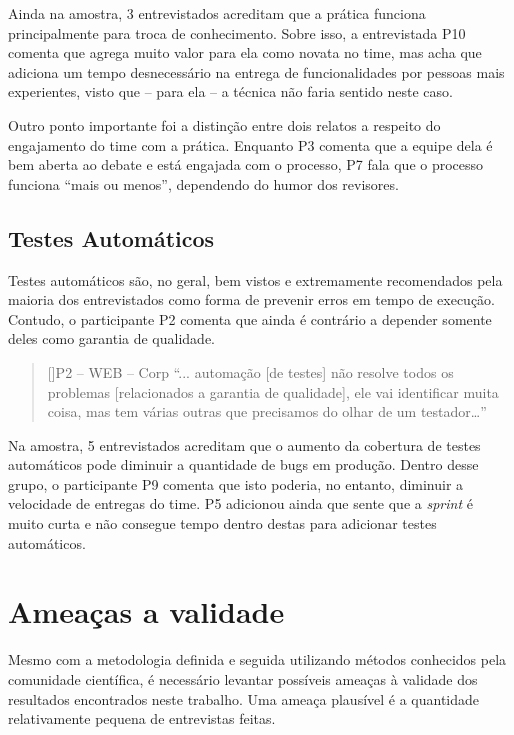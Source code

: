 Ainda na amostra, 3 entrevistados acreditam que a prática funciona principalmente para troca de conhecimento. Sobre isso, a entrevistada P10 comenta que agrega muito valor para ela como novata no time, mas acha que adiciona um tempo desnecessário na entrega de funcionalidades por pessoas mais experientes, visto que -- para ela -- a técnica não faria sentido neste caso.

Outro ponto importante foi a distinção entre dois relatos a respeito do engajamento do time com a prática. Enquanto P3 comenta que a equipe dela é bem aberta ao debate e está engajada com o processo, P7 fala que o processo funciona ``mais ou menos'', dependendo do humor dos revisores.

\subsection{Testes Automáticos}

Testes automáticos são, no geral, bem vistos e extremamente recomendados pela maioria dos entrevistados como forma de prevenir erros em tempo de execução. Contudo, o participante P2 comenta que ainda é contrário a depender somente deles como garantia de qualidade.

\begin{quotation}[]{P2 -- WEB -- Corp}
    ``... automação [de testes] não resolve todos os problemas [relacionados a garantia de qualidade], ele vai identificar muita coisa, mas tem várias outras que precisamos do olhar de um testador…''
\end{quotation}

Na amostra, 5 entrevistados acreditam que o aumento da cobertura de testes automáticos pode diminuir a quantidade de bugs em produção. Dentro desse grupo, o participante P9 comenta que isto poderia, no entanto, diminuir a velocidade de entregas do time. P5 adicionou ainda que sente que a \emph{sprint} é muito curta e não consegue tempo dentro destas para adicionar testes automáticos.

\section{Ameaças a validade}

Mesmo com a metodologia definida e seguida utilizando métodos conhecidos pela comunidade científica, é necessário levantar possíveis ameaças à validade dos resultados encontrados neste trabalho. Uma ameaça plausível é a quantidade relativamente pequena de entrevistas feitas.

